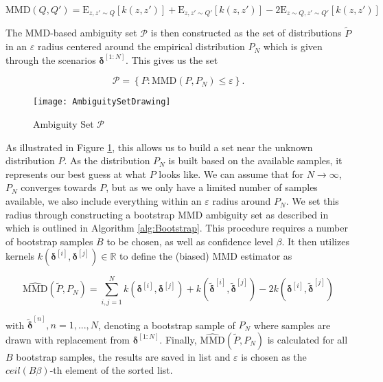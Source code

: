 \begin{equation} \label{MMD Kernel}
\text{MMD}(Q, Q') = \text{E}_{z,z' \sim Q}[k(z,z')] + \text{E}_{z,z' \sim Q'}[k(z,z')] - 2\text{E}_{z\sim Q, z' \sim Q'}[k(z,z')]
\end{equation}

The MMD-based ambiguity set $\mathcal{P}$ is then constructed as the set of distributions $\tilde{P}$ in an $\varepsilon$ radius centered around the empirical distribution $P_N$ which is given through the scenarios $\boldsymbol{\delta}^{[1:N]}$. This gives us the set

\begin{equation} \label{ambiguity set}
\mathcal{P} =  \left\{ P : \text{MMD} (P, P_N) \leq \varepsilon \right\}.
\end{equation}

\begin{figure}
\centering
\texttt{[image: AmbiguitySetDrawing]}
\caption{Ambiguity Set $\mathcal{P}$}
\label{AmbiguityPic}
\end{figure}

As illustrated in Figure \ref{AmbiguityPic}, this allows us to build a set near the unknown distribution $P$. As the distribution $P_N$ is built based on the available samples, it represents our best guess at what $P$ looks like. We can assume that for $N \to \infty$, $P_N$ converges towards $P$, but as we only have a limited number of samples available, we also include everything within an $\varepsilon$ radius around $P_N$. We set this radius through constructing a bootstrap MMD ambiguity set as described in \cite{Yassine_22} which is outlined in Algorithm \ref{alg:Bootstrap}. This procedure requires a number of bootstrap samples $B$ to be chosen, as well as confidence level $\beta$. It then utilizes kernels $k(\boldsymbol{\delta}^{[i]}, \boldsymbol{\delta}^{[j]}) \in \mathbb{R}$ to define the (biased) MMD estimator as 

\begin{equation} \label{ambiguity set approx}
\widehat{\text{MMD}} (\tilde{P}, P_N) = \sum_{i,j = 1}^N k(\boldsymbol{\delta}^{[i]}, \boldsymbol{\delta}^{[j]}) + k(\tilde{\boldsymbol{\delta}}^{[i]}, \tilde{\boldsymbol{\delta}}^{[j]}) - 2 k(\boldsymbol{\delta}^{[i]}, \tilde{\boldsymbol{\delta}}^{[j]})
\end{equation}

with $\tilde{\boldsymbol{\delta}}^{[n]}, n = 1,...,N$, denoting a bootstrap sample of $P_N$ where samples are drawn with replacement from $\boldsymbol{\delta}^{[1:N]}$. Finally, $\widehat{\text{MMD}} (\tilde{P}, P_N)$ is calculated for all $B$ bootstrap samples, the results are saved in list and $\varepsilon$ is chosen as the $\textit{ceil}(B \beta)$-th element of the sorted list. 


